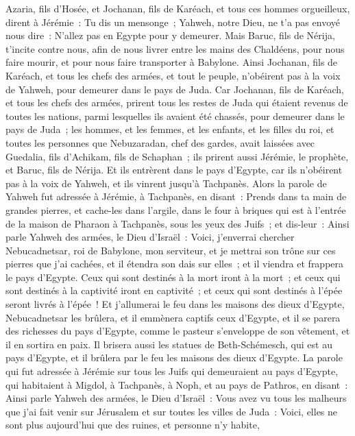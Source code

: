 \begin{multicols}{2}
Azaria, fils d'Hosée, et Jochanan, fils de Karéach, et tous ces hommes orgueilleux, dirent à Jérémie~: Tu dis un mensonge~; Yahweh, notre Dieu, ne t'a pas envoyé nous dire~: N'allez pas en Egypte pour y demeurer.
Mais Baruc, fils de Nérija, t'incite contre nous, afin de nous livrer entre les mains des Chaldéens, pour nous faire mourir, et pour nous faire transporter à Babylone.
Ainsi Jochanan, fils de Karéach, et tous les chefs des armées, et tout le peuple, n'obéirent pas à la voix de Yahweh, pour demeurer dans le pays de Juda.
Car Jochanan, fils de Karéach, et tous les chefs des armées, prirent tous les restes de Juda qui étaient revenus de toutes les nations, parmi lesquelles ils avaient été chassés, pour demeurer dans le pays de Juda~;
les hommes, et les femmes, et les enfants, et les filles du roi, et toutes les personnes que Nebuzaradan, chef des gardes, avait laissées avec Guedalia, fils d'Achikam, fils de Schaphan~; ils prirent aussi Jérémie, le prophète, et Baruc, fils de Nérija.
Et ils entrèrent dans le pays d'Egypte, car ils n'obéirent pas à la voix de Yahweh, et ils vinrent jusqu'à Tachpanès.
Alors la parole de Yahweh fut adressée à Jérémie, à Tachpanès, en disant~:
Prends dans ta main de grandes pierres, et cache-les dans l'argile, dans le four à briques qui est à l'entrée de la maison de Pharaon à Tachpanès, sous les yeux des Juifs~;
et dis-leur~: Ainsi parle Yahweh des armées, le Dieu d'Israël~: Voici, j'enverrai chercher Nebucadnetsar, roi de Babylone, mon serviteur, et je mettrai son trône sur ces pierres que j'ai cachées, et il étendra son dais sur elles~;
et il viendra et frappera le pays d'Egypte. Ceux qui sont destinés à la mort iront à la mort~; et ceux qui sont destinés à la captivité iront en captivité~; et ceux qui sont destinés à l'épée seront livrés à l'épée~!
Et j'allumerai le feu dans les maisons des dieux d'Egypte, Nebucadnetsar les brûlera, et il emmènera captifs ceux d'Egypte, et il se parera des richesses du pays d'Egypte, comme le pasteur s'enveloppe de son vêtement, et il en sortira en paix.
Il brisera aussi les statues de Beth-Schémesch, qui est au pays d'Egypte, et il brûlera par le feu les maisons des dieux d'Egypte.
\VerseOne{}La parole qui fut adressée à Jérémie sur tous les Juifs qui demeuraient au pays d'Egypte, qui habitaient à Migdol, à Tachpanès, à Noph, et au pays de Pathros, en disant~:
Ainsi parle Yahweh des armées, le Dieu d'Israël~: Vous avez vu tous les malheurs que j'ai fait venir sur Jérusalem et sur toutes les villes de Juda~: Voici, elles ne sont plus aujourd'hui que des ruines, et personne n'y habite,

\end{multicols}
